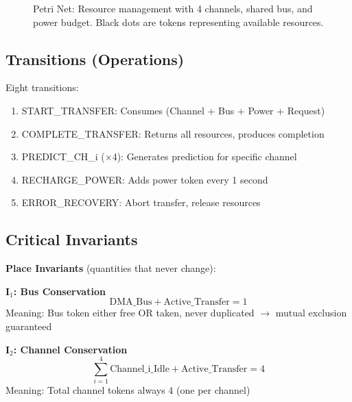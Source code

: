\documentclass[conference]{IEEEtran}
\begin{document}
\begin{figure}[h]
{
}
\caption{Petri Net: Resource management with 4 channels, shared bus, and power budget. Black dots are tokens representing available resources.}
\label{fig:petri}
\end{figure}

\subsection{Transitions (Operations)}
Eight transitions:
\begin{enumerate}
    \item START\_TRANSFER: Consumes (Channel + Bus + Power + Request)
    \item COMPLETE\_TRANSFER: Returns all resources, produces completion
    \item PREDICT\_CH\_i (×4): Generates prediction for specific channel
    \item RECHARGE\_POWER: Adds power token every 1 second
    \item ERROR\_RECOVERY: Abort transfer, release resources
\end{enumerate}

\subsection{Critical Invariants}
\textbf{Place Invariants} (quantities that never change):

\textbf{I$_1$: Bus Conservation}
\begin{equation}
\text{DMA\_Bus} + \text{Active\_Transfer} = 1
\end{equation}
Meaning: Bus token either free OR taken, never duplicated $\rightarrow$ mutual exclusion guaranteed

\textbf{I$_2$: Channel Conservation}
\begin{equation}
\sum_{i=1}^{4} \text{Channel\_i\_Idle} + \text{Active\_Transfer} = 4
\end{equation}
Meaning: Total channel tokens always 4 (one per channel)
\end{document}
